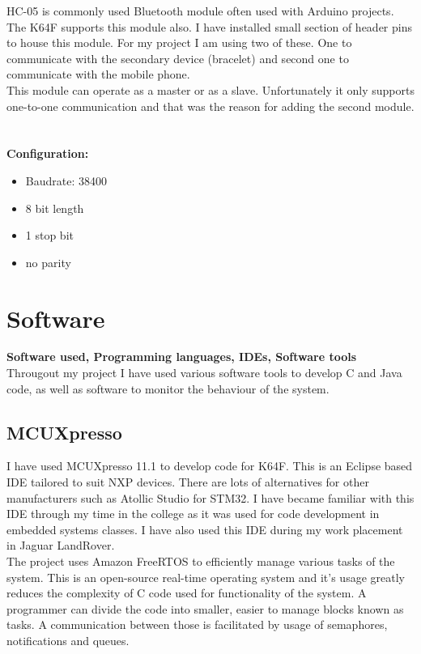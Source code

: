 \documentclass[12pt,a4paper]{article}
\begin{document}
		HC-05 is commonly used Bluetooth module often used with Arduino projects. The K64F supports  
		this module also. I have installed small section of header pins to house this module. For my  
		project I am using two of these. One to communicate with the secondary device (bracelet) and  
		second one to communicate with the mobile phone.\\
		
		This module can operate as a master or as a slave. Unfortunately it only supports one-to-one  
		communication and that was the reason for adding the second module.\\\\\\
		
		{\bfseries Configuration:}
		\begin{itemize}
			\item Baudrate: 38400
			\item 8 bit length
			\item 1 stop bit
			\item no parity

		\end{itemize}
		\newpage
		
	\section{Software}
	{\bfseries Software used, Programming languages, IDEs, Software tools}\\
	Througout my project I have used various software tools to develop C and Java code, as well as
	software to monitor the behaviour of the system.
	
		\subsection{MCUXpresso}
		I have used MCUXpresso 11.1 to develop code for K64F. This is an Eclipse based IDE tailored to suit NXP devices. There are lots of alternatives for other manufacturers such as Atollic Studio for STM32. I have became familiar with this IDE through my time in the college as it 
		was used for code development in embedded systems classes. I have also used this IDE during my work placement in Jaguar LandRover.\\
		
		The project uses Amazon FreeRTOS to efficiently manage various tasks of the system. This is an open-source real-time operating system and it's usage greatly reduces the complexity of  C code used for functionality of the system. A programmer can divide the code into smaller, easier to manage blocks known as tasks. A communication between those is facilitated by usage of semaphores, notifications and queues.\\
		
\end{document}
